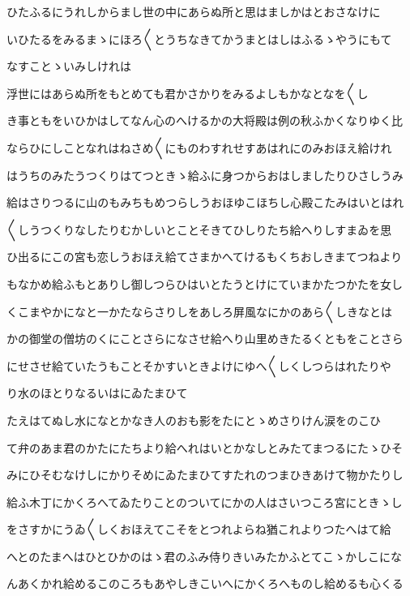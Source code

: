 \documentclass[a4paper,11pt,landscape]{ltjtarticle}
\begin{document}
ひたふるにうれしからまし世の中にあらぬ所と思はましかはとおさなけに
\par\medskip
いひたるをみるまゝにほろ〱とうちなきてかうまとはしはふるゝやうにもて
\par\medskip
なすことゝいみしけれは
\par\medskip
浮世にはあらぬ所をもとめても君かさかりをみるよしもかなとなを〱し
\par\medskip
き事ともをいひかはしてなん心のへけるかの大将殿は例の秋ふかくなりゆく比
\par\medskip
ならひにしことなれはねさめ〱にものわすれせすあはれにのみおほえ給けれ
\par\medskip
はうちのみたうつくりはてつときゝ給ふに身つからおはしましたりひさしうみ
\par\medskip
給はさりつるに山のもみちもめつらしうおほゆこほちし心殿こたみはいとはれ
\par\medskip
〱しうつくりなしたりむかしいとことそきてひしりたち給へりしすまゐを思
\par\medskip
ひ出るにこの宮も恋しうおほえ給てさまかへてけるもくちおしきまてつねより
\par\medskip
もなかめ給ふもとありし御しつらひはいとたうとけにていまかたつかたを女し
\par\medskip
くこまやかになと一かたならさりしをあしろ屏風なにかのあら〱しきなとは
\par\medskip
かの御堂の僧坊のくにことさらになさせ給へり山里めきたるくともをことさら
\par\medskip
にせさせ給ていたうもことそかすいときよけにゆへ〱しくしつらはれたりや
\par\medskip
り水のほとりなるいはにゐたまひて
\par\medskip
たえはてぬし水になとかなき人のおも影をたにとゝめさりけん涙をのこひ
\par\medskip
て弁のあま君のかたにたちより給へれはいとかなしとみたてまつるにたゝひそ
\par\medskip
みにひそむなけしにかりそめにゐたまひてすたれのつまひきあけて物かたりし
\par\medskip
給ふ木丁にかくろへてゐたりことのついてにかの人はさいつころ宮にときゝし
\par\medskip
をさすかにうゐ〱しくおほえてこそをとつれよらね猶これよりつたへはて給
\par\medskip
へとのたまへはひとひかのはゝ君のふみ侍りきいみたかふとてこゝかしこにな
\par\medskip
んあくかれ給めるこのころもあやしきこいへにかくろへものし給めるも心くる
\par\medskip
\end{document}
